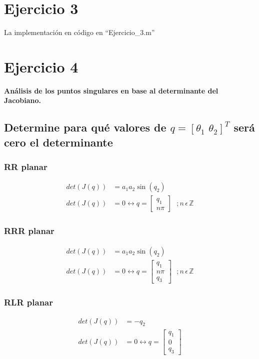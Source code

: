 \documentclass[a4paper,12pt]{article}
\begin{document}
\section{Ejercicio 3}
La implementación en código en ``Ejercicio\_3.m''

\section{Ejercicio 4}
\textbf{Análisis de los puntos singulares en base al determinante del Jacobiano.}

\subsection{Determine para qué valores de $q = \left[\theta_1\,\,\theta_2\right]^T$ será cero el determinante}

\subsubsection{RR planar}
\begin{align*}
    det(J(q)) &= a_1a_2\sin(q_2)\\
    det(J(q)) &= 0 \leftrightarrow
    q = 
    \begin{bmatrix}
        q_1\\
        n\pi
    \end{bmatrix}
    \,\,\,\,;n\,\epsilon\,\mathbb{Z}
\end{align*}

\subsubsection{RRR planar}
\begin{align*}
    det(J(q)) &= a_1a_2\sin(q_2)\\
    det(J(q)) &= 0 \leftrightarrow
    q = 
    \begin{bmatrix}
        q_1\\
        n\pi\\
        q_3
    \end{bmatrix}
    \,\,\,\,;n\,\epsilon\,\mathbb{Z}
\end{align*}

\subsubsection{RLR planar}
\begin{align*}
    det(J(q)) &= -q_2\\
    det(J(q)) &= 0 \leftrightarrow
    q = 
    \begin{bmatrix}
        q_1\\
        0\\
        q_3
    \end{bmatrix}
\end{align*}
\end{document}

